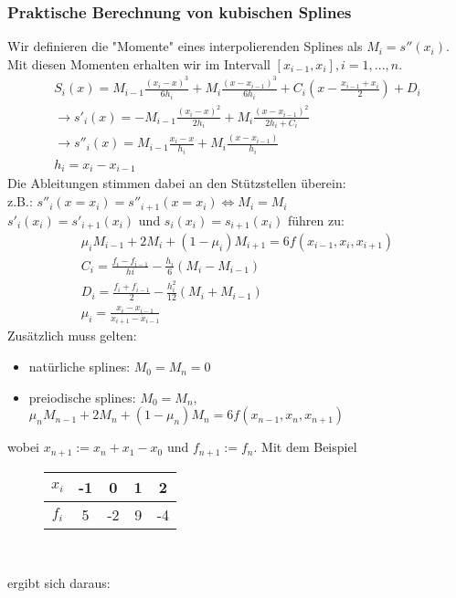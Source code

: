 \documentclass{scrartcl}
\begin{document}
\subsubsection*{Praktische Berechnung von kubischen Splines}
Wir definieren die "Momente" eines interpolierenden Splines als $M_i=s''(x_i)$. Mit diesen Momenten erhalten wir im Intervall $[x_{i-1},x_i], i=1,...,n$.
\begin{align*}
S_i(x)=M_{i-1} \frac{(x_i-x)^3}{6 h_i} + M_i \frac{(x-x_{i-1})^3}{6 h_i}+C_i(x- \frac{x_{i-1}+x_i}{2})+D_i\\
\rightarrow s'_i(x)= -M_{i-1} \frac{(x_i-x)^2}{2 h_i} + M_i \frac{(x-x_{i-1})^2}{2 h_i + C_i} \\
\rightarrow s''_i(x)= M_{i-1} \frac{x_i-x}{h_i} + M_i \frac{(x-x_{i-1})}{h_i}\\
h_i=x_i-x_{i-1}
\end{align*}
Die Ableitungen stimmen dabei an den Stützstellen überein:\\
z.B.: $s''_i(x=x_i)=s''_{i+1}(x=x_i) \Leftrightarrow M_i=M_i$ \\
$s'_i(x_i)=s'_{i+1}(x_i)$ und $s_i(x_i)=s_{i+1}(x_i)$ führen zu:
\begin{align*}
\mu_i M_{i-1} + 2 M_i + (1- \mu_i) M_{i+1} = 6 f(x_{i-1},x_i,x_{i+1})\\
C_i = \frac{f_i-f_{i-1}}{h i}- \frac{h_i}{6}(M_i-M_{i-1})\\
D_i= \frac{f_i+f_{i-1}}{2} -\frac{h_i^2}{12} (M_i+M_{i-1})\\
\mu_i = \frac{x_i-x_{i-1}}{x_{i+1}-x_{i-1}}
\end{align*}
Zusätzlich muss gelten:
\begin{itemize}
\item natürliche splines: $M_0=M_n=0$
\item preiodische splines: $M_0=M_n$, $\mu_n M_{n-1}+ 2 M_n + (1- \mu_n) M_n=6 f(x_{n-1},x_n,x_{n+1})$
\end{itemize}
wobei $x_{n+1} := x_n+x_1-x_0$ und $f_{n+1} := f_n$.
Mit dem Beispiel \begin{figure}

\center

\begin{tabular}{|c||c|c|c|c|}

$x_i$ & -1 & 0 & 1 & 2 \\ 
\hline 
$f_i$ & 5 & -2 & 9 & -4 \\ 

\end{tabular}\\  
\end{figure} ergibt sich daraus:
\end{document}
